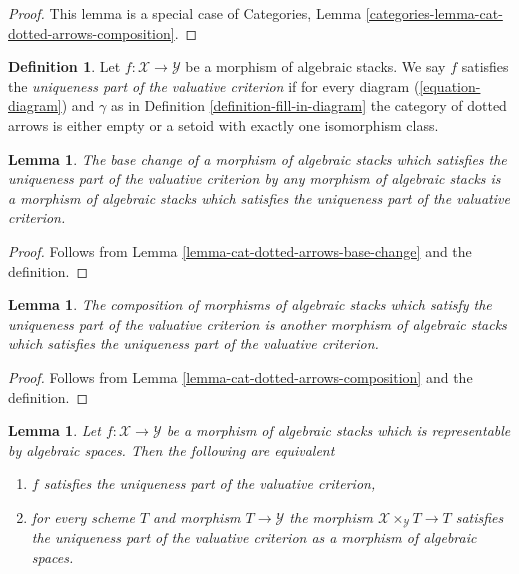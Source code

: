 \documentclass{stacks-project}
\theoremstyle{plain}
\newtheorem{lemma}[subsection]{Lemma}
\theoremstyle{definition}
\newtheorem{definition}[subsection]{Definition}
\theoremstyle{remark}
\numberwithin{equation}{subsection}
\begin{document}
\begin{proof}
This lemma is a special case of Categories, 
Lemma \ref{categories-lemma-cat-dotted-arrows-composition}.
\end{proof}

\begin{definition}
\label{definition-uniqueness}
Let $f : \mathcal{X} \to \mathcal{Y}$ be a morphism of algebraic stacks.
We say $f$ satisfies the {\it uniqueness part of the valuative criterion}
if for every diagram (\ref{equation-diagram}) and $\gamma$
as in Definition \ref{definition-fill-in-diagram}
the category of dotted arrows is either empty or
a setoid with exactly one isomorphism class.
\end{definition}

\begin{lemma}
\label{lemma-base-change-uniqueness}
The base change of a morphism of algebraic stacks which satisfies the
uniqueness part of the valuative criterion by any morphism of
algebraic stacks is a morphism of algebraic stacks which satisfies the
uniqueness part of the valuative criterion.
\end{lemma}

\begin{proof}
Follows from Lemma \ref{lemma-cat-dotted-arrows-base-change}
and the definition.
\end{proof}

\begin{lemma}
\label{lemma-composition-uniqueness}
The composition of morphisms of algebraic stacks which satisfy the
uniqueness part of the valuative criterion is another
morphism of algebraic stacks which satisfies the
uniqueness part of the valuative criterion.
\end{lemma}

\begin{proof}
Follows from Lemma \ref{lemma-cat-dotted-arrows-composition}
and the definition.
\end{proof}

\begin{lemma}
\label{lemma-uniqueness-representable}
Let $f : \mathcal{X} \to \mathcal{Y}$ be a morphism of algebraic stacks
which is representable by algebraic spaces. Then the following are equivalent
\begin{enumerate}
\item $f$ satisfies the uniqueness part of the valuative criterion,
\item for every scheme $T$ and morphism $T \to \mathcal{Y}$
the morphism $\mathcal{X} \times_\mathcal{Y} T \to T$ satisfies
the uniqueness part of the valuative criterion as a morphism
of algebraic spaces.
\end{enumerate}
\end{lemma}
\end{document}
